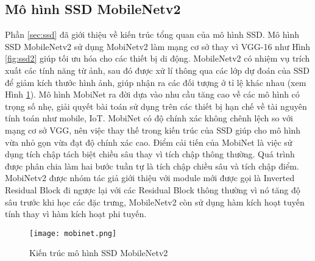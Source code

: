 \documentclass[../the.tex]{subfiles}
\begin{document}
\subsection{Mô hình SSD MobileNetv2}
{\fontsize{13}{12} \selectfont

	Phần \ref{sec:ssd} đã giới thiệu về kiến trúc tổng quan của mô hình SSD. Mô hình SSD MobileNetv2 sử dụng MobiNetv2 \cite{sandler2019mobilenetv2} làm mạng cơ sở thay vì VGG-16 như Hình \ref{fig:ssd2} giúp tối ưu hóa cho các thiết bị di động. MobileNetv2 có nhiệm vụ trích xuất các tính năng từ ảnh, sau đó được xử lí thông qua các lớp dự đoán của SSD để giảm kích thước hình ảnh, giúp nhận ra các đối tượng ở tỉ lệ khác nhau (xem Hình \ref{fig:mobinet}).
	Mô hình MobiNet ra đời dựa vào nhu cầu tăng cao về các mô hình có trọng số nhẹ, giải quyết bài toán sử dụng trên các thiết bị hạn chế về tài nguyên tính toán như mobile, IoT. MobiNet có độ chính xác không chênh lệch so với mạng cơ sở VGG, nên việc thay thế trong kiến trúc của SSD giúp cho mô hình vừa nhỏ gọn vừa đạt độ chính xác cao.
	Điểm cải tiến của MobiNet là việc sử dụng tích chập tách biệt chiều sâu thay vì tích chập thông thường. Quá trình được phân chia làm hai bước tuần tự là tích chập chiều sâu và tích chập điểm.
	MobiNetv2 được nhóm tác giả giới thiệu với module mới được gọi là Inverted Residual Block đi ngược lại với các Residual Block thông thường vì nó tăng độ sâu trước khi học các đặc trưng, MobileNetv2 còn sử dụng hàm kích hoạt tuyến tính thay vì hàm kích hoạt phi tuyến.

}


\begin{figure}[H]
	\centering
	\texttt{[image: mobinet.png]}
	\caption{Kiến trúc mô hình SSD MobileNetv2}
	\label{fig:mobinet}
\end{figure}


\end{document}
